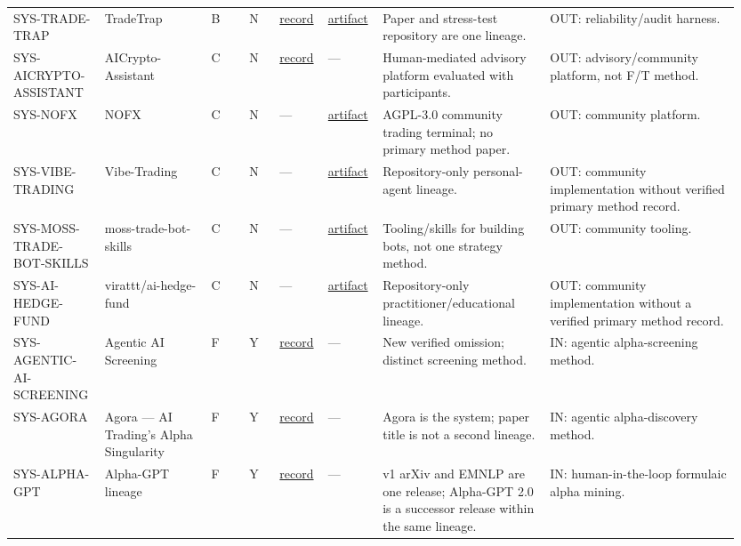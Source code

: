\begin{longtable}{@{}L{0.12\linewidth}L{0.14\linewidth}L{0.05\linewidth}L{0.04\linewidth}L{0.06\linewidth}L{0.07\linewidth}L{0.22\linewidth}L{0.25\linewidth}@{}}
SYS-\allowbreak{}TRADE-\allowbreak{}TRAP & TradeTrap & B & N & \href{https://arxiv.org/abs/2512.02261}{record} & \href{https://github.com/Yanlewen/TradeTrap}{artifact} & Paper and stress-test repository are one lineage. & OUT: reliability/audit harness. \\
SYS-\allowbreak{}AICRYPTO-\allowbreak{}ASSISTANT & AICrypto-Assistant & C & N & \href{https://doi.org/10.36287/setsci.24.2.017}{record} & --- & Human-mediated advisory platform evaluated with participants. & OUT: advisory/community platform, not F/T method. \\
SYS-\allowbreak{}NOFX & NOFX & C & N & --- & \href{https://github.com/NoFxAiOS/nofx}{artifact} & AGPL-3.0 community trading terminal; no primary method paper. & OUT: community platform. \\
SYS-\allowbreak{}VIBE-\allowbreak{}TRADING & Vibe-Trading & C & N & --- & \href{https://github.com/HKUDS/Vibe-Trading}{artifact} & Repository-only personal-agent lineage. & OUT: community implementation without verified primary method record. \\
SYS-\allowbreak{}MOSS-\allowbreak{}TRADE-\allowbreak{}BOT-\allowbreak{}SKILLS & moss-trade-bot-skills & C & N & --- & \href{https://github.com/moss-site/moss-trade-bot-skills}{artifact} & Tooling/skills for building bots, not one strategy method. & OUT: community tooling. \\
SYS-\allowbreak{}AI-\allowbreak{}HEDGE-\allowbreak{}FUND & virattt/ai-hedge-fund & C & N & --- & \href{https://github.com/virattt/ai-hedge-fund}{artifact} & Repository-only practitioner/educational lineage. & OUT: community implementation without a verified primary method record. \\
SYS-\allowbreak{}AGENTIC-\allowbreak{}AI-\allowbreak{}SCREENING & Agentic AI Screening & F & Y & \href{https://arxiv.org/abs/2603.23300}{record} & --- & New verified omission; distinct screening method. & IN: agentic alpha-screening method. \\
SYS-\allowbreak{}AGORA & Agora — AI Trading's Alpha Singularity & F & Y & \href{https://arxiv.org/abs/2606.29194}{record} & --- & Agora is the system; paper title is not a second lineage. & IN: agentic alpha-discovery method. \\
SYS-\allowbreak{}ALPHA-\allowbreak{}GPT & Alpha-GPT lineage & F & Y & \href{https://arxiv.org/abs/2308.00016}{record} & --- & v1 arXiv and EMNLP are one release; Alpha-GPT 2.0 is a successor release within the same lineage. & IN: human-in-the-loop formulaic alpha mining. \\

\end{longtable}
